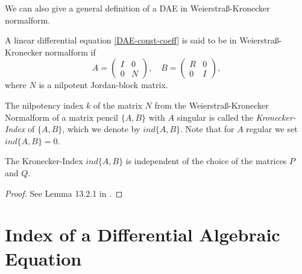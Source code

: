 We can also give a general definition of a DAE in Weierstraß-Kronecker normalform.
\begin{definition}
	A linear differential equation \eqref{DAE-const-coeff} is said to be in Weierstraß-Kronecker normalform if
	\begin{displaymath}
		A = 
		\left(
		\begin{matrix}
			I & 0 \\
			0 & N
		\end{matrix}
		\right), \quad
		B = 
		\left(
		\begin{matrix}
			R & 0 \\
			0 & I
		\end{matrix}
		\right),
	\end{displaymath}
	where $N$ is a nilpotent Jordan-block matrix.
\end{definition}

\begin{definition}
	The nilpotency index $k$ of the matrix $N$ from the Weierstraß-Kronecker Normalform of a matrix pencil $\{A,B\}$ with $A$ singular is called the \emph{Kronecker-Index} of $\{A,B\}$, which we denote by $ind\{A,B\}$. Note that for $A$ regular we set $ind\{A,B\} = 0$.
\end{definition}


\begin{lemma}
	\label{Lemma:indipendence of Kronecker index}
	The Kronecker-Index $ind\{A,B\}$ is independent of the choice of the matrices $P$ and $Q$.
\end{lemma}

\begin{proof}
	See Lemma 13.2.1 in .
\end{proof}





\section{Index of a Differential Algebraic Equation}

